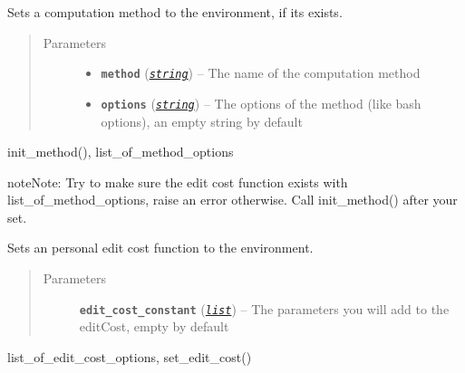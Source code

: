 \documentclass[letterpaper,10pt,english]{sphinxmanual}
\begin{document}
\begin{fulllineitems}
\label{doc:gedlibpy.set_method}
Sets a computation method to the environment, if its exists.
\begin{quote}\begin{description}
\item[{Parameters}] \leavevmode\begin{itemize}
\item {} 
\textbf{\texttt{method}} (\href{https://docs.python.org/3/library/string.html\#module-string}{\emph{\texttt{string}}}) -- The name of the computation method

\item {} 
\textbf{\texttt{options}} (\href{https://docs.python.org/3/library/string.html\#module-string}{\emph{\texttt{string}}}) -- The options of the method (like bash options), an empty string by default

\end{itemize}

\end{description}\end{quote}




init\_method(), list\_of\_method\_options



\begin{notice}{note}{Note:}
Try to make sure the edit cost function exists with list\_of\_method\_options, raise an error otherwise. Call init\_method() after your set.
\end{notice}

\end{fulllineitems}


\begin{fulllineitems}
\label{doc:gedlibpy.set_personal_edit_cost}
Sets an personal edit cost function to the environment.
\begin{quote}\begin{description}
\item[{Parameters}] \leavevmode
\textbf{\texttt{edit\_cost\_constant}} (\href{https://docs.python.org/3/library/stdtypes.html\#list}{\emph{\texttt{list}}}) -- The parameters you will add to the editCost, empty by default

\end{description}\end{quote}




list\_of\_edit\_cost\_options, set\_edit\_cost()



\end{fulllineitems}
\end{document}
